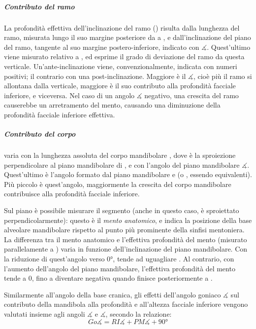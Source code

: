\subparagraph{Contributo del ramo} La profondità effettiva dell'inclinazione del ramo () risulta dalla lunghezza del ramo, misurata lungo il suo margine posteriore da  a , e dall'inclinazione del piano del ramo, tangente al suo margine postero-inferiore, indicato con $\measuredangle$. Quest'ultimo viene misurato relativo a , ed esprime il grado di deviazione del ramo da questa verticale. Un'ante-inclinazione viene, convenzionalmente, indicata con numeri positivi; il contrario con una post-inclinazione. Maggiore è il $\measuredangle$, cioè più il ramo si allontana dalla verticale, maggiore è il suo contributo alla profondità facciale inferiore, e viceversa. Nel caso di un angolo $\measuredangle$ negativo, una crescita del ramo causerebbe un arretramento del mento, causando una diminuzione della profondità facciale inferiore effettiva.

\subparagraph{Contributo del corpo} \label{sec:coben_mandibola}  varia con la lunghezza assoluta del corpo mandibolare , dove  è la sproiezione perpendicolare al piano mandibolare di , e con l'angolo del piano mandibolare $\measuredangle$. Quest'ultimo è l'angolo formato dal piano mandibolare e  (o , essendo equivalenti). Più piccolo è quest'angolo, maggiormente la crescita del corpo mandibolare contribuisce alla profondità facciale inferiore.

Sul piano  è possibile misurare il segmento  (anche in questo caso,  è sproiettato perpendicolarmente): questo è il \emph{mento anatomico}, e indica la posizione della base alveolare mandibolare rispetto al punto più prominente della sinfisi mentoniera. La differenza tra il mento anatomico e l'effettiva profondità del mento  (misurato parallelamente a ) varia in funzione dell'inclinazione del piano mandibolare. Con la riduzione di quest'angolo verso $0°$,  tende ad uguagliare . Al contrario, con l'aumento dell'angolo del piano mandibolare, l'effettiva profondità del mento tende a 0, fino a diventare negativa quando  finisce posteriormente a .

Similarmente all'angolo della base cranica, gli effetti dell'angolo goniaco $\measuredangle$ sul contributo della mandibola alla profondità e all'altezza facciale inferiore vengono valutati insieme agli angoli $\measuredangle$ e $\measuredangle$, secondo la relazione:
\begin{equation}
Go\measuredangle = RI\measuredangle + PM\measuredangle + 90°
\end{equation}

